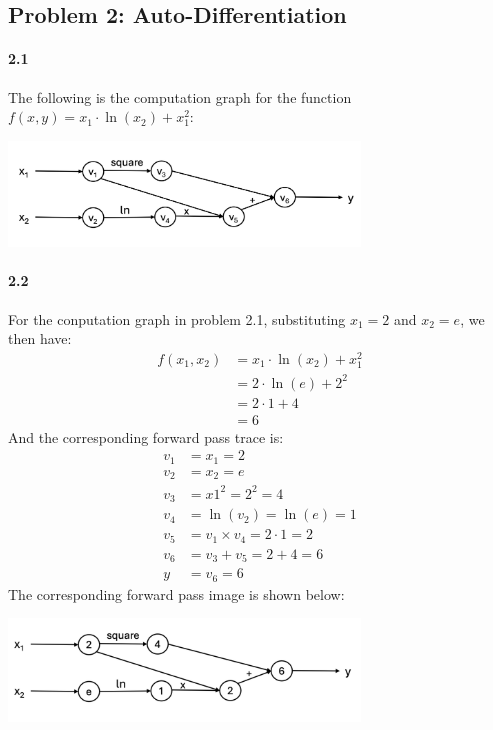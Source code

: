 \documentclass[11pt]{article}
\begin{document}
\subsection*{\Large Problem 2: Auto-Differentiation}
\paragraph{2.1}
The following is the computation graph for the function $f(x,y) = x_1\cdot\ln(x_2)+x_1^2$:
\begin{center}
  \includegraphics[width=0.7\textwidth]{Problem2.1.png}
\end{center}

\paragraph{2.2}
For the conputation graph in problem 2.1, substituting $x_1=2$ and $x_2=e$, we then have:
\begin{equation}
  \begin{split}
    f(x_1,x_2) &= x_1\cdot\ln(x_2)+x_1^2 \\
    &= 2\cdot\ln(e)+2^2 \\
    &= 2\cdot 1 + 4 \\
    &= 6
  \end{split}
\end{equation}
And the corresponding forward pass trace is:
\begin{equation}
\begin{split}
  v_1 &= x_1 = 2 \\
  v_2 &= x_2 = e \\
  v_3 &= x1^2 = 2^2 = 4 \\
  v_4 &= \ln(v_2) = \ln(e) = 1 \\
  v_5 &= v_1\times v_4 = 2\cdot 1 = 2 \\
  v_6 &=v_3 + v_5 = 2+ 4 = 6 \\
  y &= v_6 = 6
\end{split}
\end{equation}
The corresponding forward pass image is shown below:
\begin{center}
  \includegraphics[width=0.7\textwidth]{Problem2.2.png}
\end{center}
\end{document}
